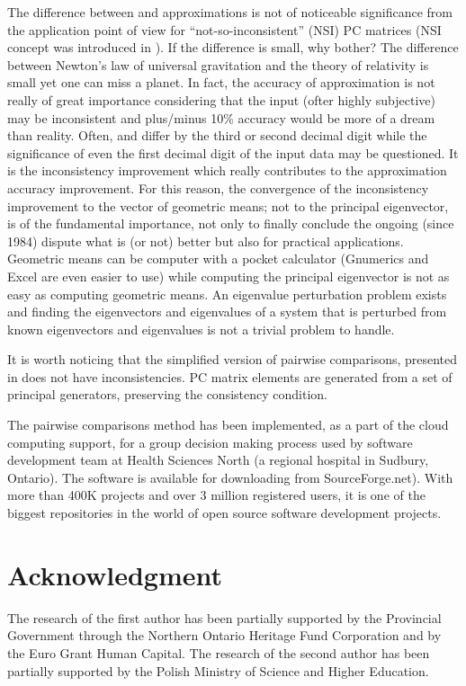 \documentclass [12pt]{article}
\theoremstyle{definition}
\begin{document}
The difference between  and  approximations is not of noticeable significance from the application point of view for ``not-so-inconsistent'' (NSI) PC matrices (NSI concept was introduced in \cite{HK1996}). If the difference is small, why bother? The difference between Newton's law of universal gravitation and the theory of relativity is small yet one can miss a planet. 
In fact, the accuracy of approximation is not really of great importance considering that the input (ofter highly subjective) may be inconsistent and plus/minus 10\% accuracy would be more of a dream than reality. Often,  and   differ by the third or second decimal digit while the significance of even the first decimal digit of the input data may be questioned. 
It is the inconsistency improvement which really contributes to the approximation accuracy improvement. For this reason, the convergence of the inconsistency improvement to the vector of geometric means; not to the principal eigenvector, is of the fundamental importance, not only to finally conclude the ongoing (since 1984) dispute what is (or not) better but also for practical applications. Geometric means can be computer with a pocket calculator (Gnumerics and Excel are even easier to use) while computing the principal eigenvector is not as easy as computing geometric means. An eigenvalue perturbation problem exists and finding the eigenvectors and eigenvalues of a system that is perturbed from known eigenvectors and eigenvalues is not a trivial problem to handle.

It is worth noticing that the simplified version of pairwise comparisons, presented in \cite{KS2015a} does not have inconsistencies. PC matrix elements are generated from a set of principal generators, preserving the consistency condition.

The pairwise comparisons method has been implemented, as a part of the cloud computing support, for a group decision making process used by software development team at Health Sciences North (a regional hospital in Sudbury, Ontario). The software is available for downloading from SourceForge.net). With more than 400K projects and over 3 million registered users, it is one of the biggest repositories in the world of open source software development projects.

\section*{Acknowledgment}
The research of the first author has been partially supported by the Provincial Government through the Northern Ontario Heritage Fund Corporation and by the Euro Grant Human Capital. The research of the second author has been partially supported by the Polish Ministry of Science and Higher Education. 
\end{document}
